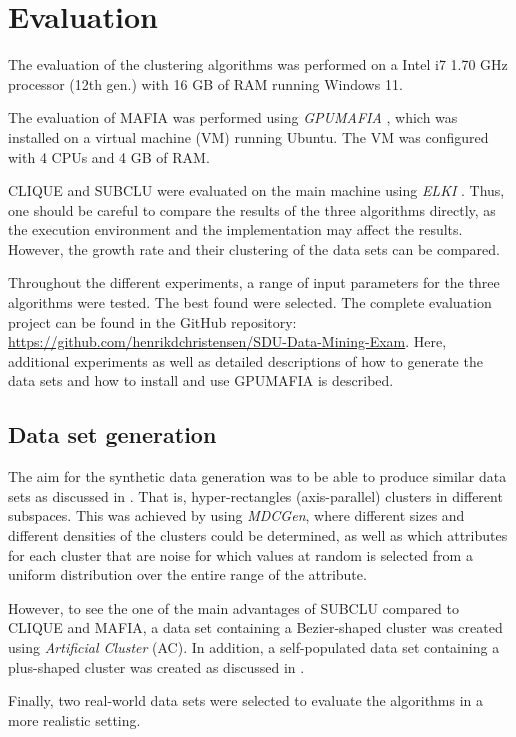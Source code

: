 \section{Evaluation}
The evaluation of the clustering algorithms was performed on a Intel i7 1.70 GHz processor (12th gen.) with 16 GB of RAM running Windows 11.

The evaluation of MAFIA was performed using \textit{GPUMAFIA} \cite{gpumafia}, which was installed on a virtual machine (VM) running Ubuntu. The VM was configured with 4 CPUs and 4 GB of RAM.

CLIQUE and SUBCLU were evaluated on the main machine using \textit{ELKI} \cite{elki}. Thus, one should be careful to compare the results of the three algorithms directly, as the execution environment and the implementation may affect the results. However, the growth rate and their clustering of the data sets can be compared.

Throughout the different experiments, a range of input parameters for the three algorithms were tested. The best found were selected. The complete evaluation project can be found in the GitHub repository: \url{https://github.com/henrikdchristensen/SDU-Data-Mining-Exam}. Here, additional experiments as well as detailed descriptions of how to generate the data sets and how to install and use GPUMAFIA is described.

\subsection{Data set generation}
The aim for the synthetic data generation was to be able to produce similar data sets as discussed in \cite{clique,mafia}. That is, hyper-rectangles (axis-parallel) clusters in different subspaces. This was achieved by using \textit{MDCGen}, where different sizes and different densities of the clusters could be determined, as well as which attributes for each cluster that are noise for which values at random is selected from a uniform distribution over the entire range of the attribute.

However, to see the one of the main advantages of SUBCLU compared to CLIQUE and MAFIA, a data set containing a Bezier-shaped cluster was created using \textit{Artificial Cluster} (AC). In addition, a self-populated data set containing a plus-shaped cluster was created as discussed in \cite{mafia}.

Finally, two real-world data sets were selected to evaluate the algorithms in a more realistic setting.

